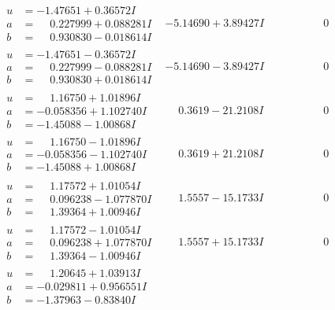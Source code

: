 \documentclass[1p]{elsarticle_modified}
\theoremstyle{definition}
\begin{document}
$$\begin{array}{c|c|c}
\begin{aligned}
u &= -1.47651 + 0.36572 I \\
a &= \phantom{-}0.227999 + 0.088281 I \\
b &= \phantom{-}0.930830 - 0.018614 I\end{aligned}
 & -5.14690 + 3.89427 I & \phantom{-0.000000 } 0 \\ \hline\begin{aligned}
u &= -1.47651 - 0.36572 I \\
a &= \phantom{-}0.227999 - 0.088281 I \\
b &= \phantom{-}0.930830 + 0.018614 I\end{aligned}
 & -5.14690 - 3.89427 I & \phantom{-0.000000 } 0 \\ \hline\begin{aligned}
u &= \phantom{-}1.16750 + 1.01896 I \\
a &= -0.058356 + 1.102740 I \\
b &= -1.45088 - 1.00868 I\end{aligned}
 & \phantom{-}0.3619 - 21.2108 I & \phantom{-0.000000 } 0 \\ \hline\begin{aligned}
u &= \phantom{-}1.16750 - 1.01896 I \\
a &= -0.058356 - 1.102740 I \\
b &= -1.45088 + 1.00868 I\end{aligned}
 & \phantom{-}0.3619 + 21.2108 I & \phantom{-0.000000 } 0 \\ \hline\begin{aligned}
u &= \phantom{-}1.17572 + 1.01054 I \\
a &= \phantom{-}0.096238 - 1.077870 I \\
b &= \phantom{-}1.39364 + 1.00946 I\end{aligned}
 & \phantom{-}1.5557 - 15.1733 I & \phantom{-0.000000 } 0 \\ \hline\begin{aligned}
u &= \phantom{-}1.17572 - 1.01054 I \\
a &= \phantom{-}0.096238 + 1.077870 I \\
b &= \phantom{-}1.39364 - 1.00946 I\end{aligned}
 & \phantom{-}1.5557 + 15.1733 I & \phantom{-0.000000 } 0 \\ \hline\begin{aligned}
u &= \phantom{-}1.20645 + 1.03913 I \\
a &= -0.029811 + 0.956551 I \\
b &= -1.37963 - 0.83840 I\end{aligned}

\end{array}$$
\end{document}
